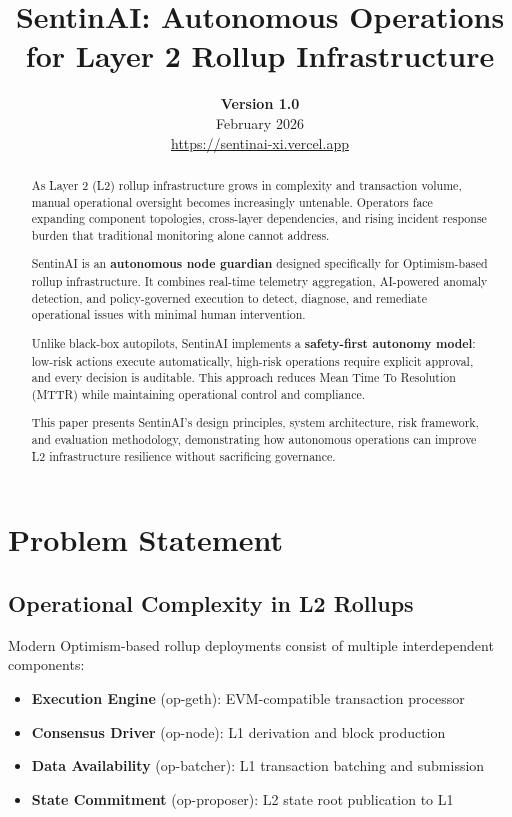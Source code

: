 \documentclass[11pt,a4paper]{article}
\title{\textbf{SentinAI: Autonomous Operations for Layer 2 Rollup Infrastructure}}
\author{
    \textbf{Version 1.0}\\
    February 2026\\[1em]
    \href{https://sentinai-xi.vercel.app}{https://sentinai-xi.vercel.app}
}
\date{}
\begin{document}
\maketitle
\thispagestyle{empty}

\begin{abstract}
As Layer 2 (L2) rollup infrastructure grows in complexity and transaction volume, manual operational oversight becomes increasingly untenable. Operators face expanding component topologies, cross-layer dependencies, and rising incident response burden that traditional monitoring alone cannot address.

SentinAI is an \textbf{autonomous node guardian} designed specifically for Optimism-based rollup infrastructure. It combines real-time telemetry aggregation, AI-powered anomaly detection, and policy-governed execution to detect, diagnose, and remediate operational issues with minimal human intervention.

Unlike black-box autopilots, SentinAI implements a \textbf{safety-first autonomy model}: low-risk actions execute automatically, high-risk operations require explicit approval, and every decision is auditable. This approach reduces Mean Time To Resolution (MTTR) while maintaining operational control and compliance.

This paper presents SentinAI's design principles, system architecture, risk framework, and evaluation methodology, demonstrating how autonomous operations can improve L2 infrastructure resilience without sacrificing governance.
\end{abstract}

\newpage
\tableofcontents
\newpage

\section{Problem Statement}

\subsection{Operational Complexity in L2 Rollups}

Modern Optimism-based rollup deployments consist of multiple interdependent components:

\begin{itemize}
    \item \textbf{Execution Engine} (op-geth): EVM-compatible transaction processor
    \item \textbf{Consensus Driver} (op-node): L1 derivation and block production
    \item \textbf{Data Availability} (op-batcher): L1 transaction batching and submission
    \item \textbf{State Commitment} (op-proposer): L2 state root publication to L1
\end{itemize}
\end{document}
